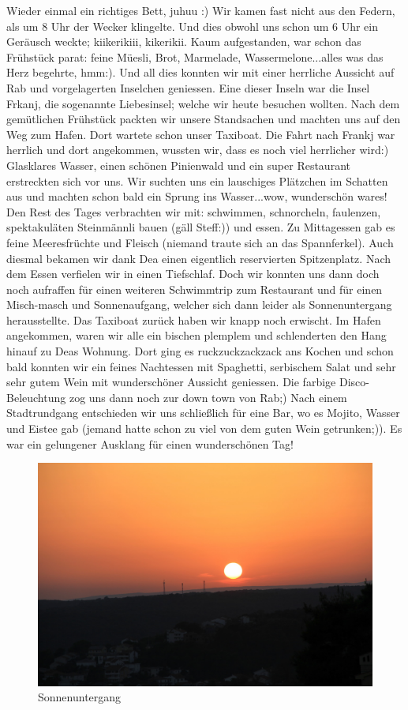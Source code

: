 Wieder einmal ein richtiges Bett, juhuu :) Wir kamen fast nicht aus den Federn, als um 8 Uhr der Wecker klingelte.
Und dies obwohl uns schon um 6 Uhr ein Geräusch weckte; kiikerikiii, kikerikii.
Kaum aufgestanden, war schon das Frühstück parat: feine Müesli, Brot, Marmelade, Wassermelone...alles was das Herz begehrte, hmm:).
Und all dies konnten wir mit einer herrliche Aussicht auf Rab und vorgelagerten Inselchen geniessen.
Eine dieser Inseln war die Insel Frkanj, die sogenannte Liebesinsel; welche wir heute besuchen wollten.
Nach dem gemütlichen Frühstück packten wir unsere Standsachen und machten uns auf den Weg zum Hafen.  Dort wartete schon unser Taxiboat.
Die Fahrt nach Frankj war herrlich und dort angekommen, wussten wir, dass es noch viel herrlicher wird:) Glasklares Wasser, einen schönen Pinienwald und ein super Restaurant erstreckten sich vor uns.
Wir suchten uns ein lauschiges Plätzchen im Schatten aus und machten schon bald ein Sprung ins Wasser...wow, wunderschön wares! Den Rest des Tages verbrachten wir mit: schwimmen, schnorcheln, faulenzen, spektakuläten Steinmännli bauen (gäll Steff:)) und essen.
Zu Mittagessen gab es feine Meeresfrüchte und Fleisch (niemand traute sich an das Spannferkel).
Auch diesmal bekamen wir dank Dea einen eigentlich reservierten Spitzenplatz.
Nach dem Essen verfielen wir in einen Tiefschlaf.
Doch wir konnten uns dann doch noch aufraffen für einen weiteren Schwimmtrip zum Restaurant und für einen Misch-masch und Sonnenaufgang, welcher sich dann leider als Sonnenuntergang herausstellte.
Das Taxiboat zurück haben wir knapp noch erwischt.
Im Hafen angekommen, waren wir alle ein bischen plemplem und schlenderten den Hang hinauf zu Deas Wohnung.
Dort ging es ruckzuckzackzack ans Kochen und schon bald konnten wir ein feines Nachtessen mit Spaghetti, serbischem Salat und sehr sehr gutem Wein mit wunderschöner Aussicht geniessen.
Die farbige Disco-Beleuchtung zog uns dann noch zur down town von Rab;) Nach einem Stadtrundgang entschieden wir uns schließlich für eine Bar, wo es Mojito, Wasser und Eistee gab (jemand hatte schon zu viel von dem guten Wein getrunken;)).
Es war ein gelungener Ausklang für einen wunderschönen Tag!

\begin{figure}[H]
    \centering
    \includegraphics[width=\textwidth]{../Bilder/Sommer2012/102.jpg}
    \caption{Sonnenuntergang}
    \label{img:Sommer10}
\end{figure}

